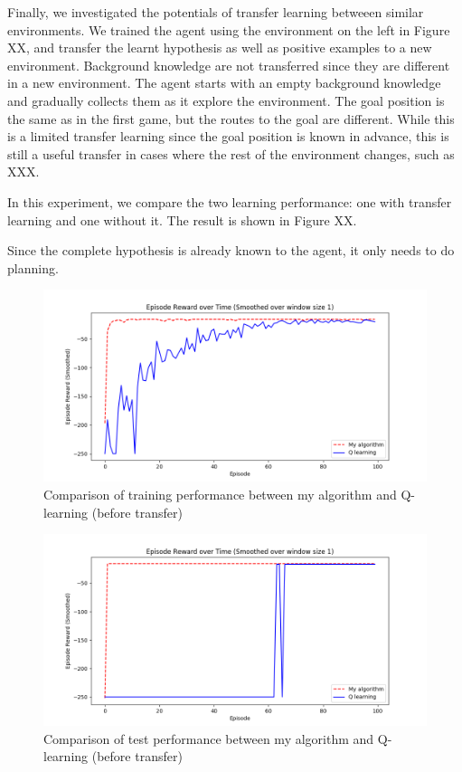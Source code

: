 Finally, we investigated the potentials of transfer learning betweeen similar environments.
We trained the agent using the environment on the left in Figure XX, and transfer the learnt hypothesis as well as positive examples to a new environment.
Background knowledge are not transferred since they are different in a new environment. The agent starts with an empty background knowledge and gradually collects them
as it explore the environment. 
The goal position is the same as in the first game, but the routes to the goal are different.
While this is a limited transfer learning since the goal position is known in advance, this is still a useful transfer in cases where the rest of the environment changes,
such as XXX.

In this experiment, we compare the two learning performance: one with transfer learning and one without it. 
The result is shown in Figure XX.

Since the complete hypothesis is already known to the agent, it only needs to do planning. 

\begin{figure}[!htb]
\centering
\includegraphics[width=1.0\textwidth]{./figures/experiment4_before_training}
\caption{Comparison of training performance between my algorithm and Q-learning (before transfer)}
\label{experiment3_training}
\end{figure}

\begin{figure}[!htb]
\centering
\includegraphics[width=1.0\textwidth]{./figures/experiment4_before_test}
\caption{Comparison of test performance between my algorithm and Q-learning (before transfer)}
\label{experiment3_test}
\end{figure}

